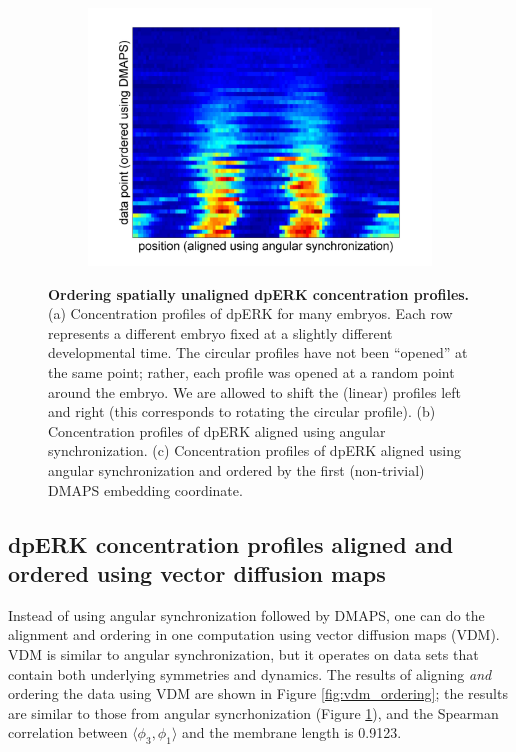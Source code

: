 \documentclass[10pt]{article}
\begin{document}
\begin{figure}[!ht]
\begin{subfigure}{0.3\textwidth}
\includegraphics[width=\textwidth]{data_ordered_angsynch}
\caption{}
\end{subfigure}
\caption{{\bf Ordering spatially unaligned dpERK concentration profiles.} (a) Concentration profiles of dpERK for many embryos. Each row represents a different embryo fixed at a slightly different developmental time. The circular profiles have not been ``opened'' at the same point; rather, each profile was opened at a random point around the embryo. We are allowed to shift the (linear) profiles left and right (this corresponds to rotating the circular profile).
(b) Concentration profiles of dpERK aligned using angular synchronization.
(c) Concentration profiles of dpERK aligned using angular synchronization and ordered by the first (non-trivial) DMAPS embedding coordinate.}
\label{fig:angsynch_ordering}
\end{figure}

\subsection*{dpERK concentration profiles aligned and ordered using vector diffusion maps}

Instead of using angular synchronization followed by DMAPS, one can do the alignment and ordering in one computation using vector diffusion maps (VDM).
%
VDM is similar to angular synchronization, but it operates on data sets that contain both underlying symmetries and dynamics.
%
The results of aligning {\em and} ordering the data using VDM are shown in Figure \ref{fig:vdm_ordering}; the results are similar to those from angular syncrhonization (Figure \ref{fig:angsynch_ordering}), and the Spearman correlation between $\langle \phi_3, \phi_1 \rangle$ and the membrane length is 0.9123.
\end{document}
